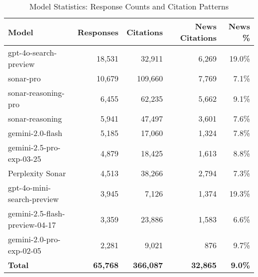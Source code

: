 \begin{table}[htbp]
\centering
\caption{Model Statistics: Response Counts and Citation Patterns}
\label{tab:model_stats}
\begin{tabular}{lrrrr}
\toprule
Model & Responses & Citations & News Citations & News \% \\
\midrule
gpt-4o-search-preview & 18,531 & 32,911 & 6,269 & 19.0\% \\
sonar-pro & 10,679 & 109,660 & 7,769 & 7.1\% \\
sonar-reasoning-pro & 6,455 & 62,235 & 5,662 & 9.1\% \\
sonar-reasoning & 5,941 & 47,497 & 3,601 & 7.6\% \\
gemini-2.0-flash & 5,185 & 17,060 & 1,324 & 7.8\% \\
gemini-2.5-pro-exp-03-25 & 4,879 & 18,425 & 1,613 & 8.8\% \\
Perplexity Sonar & 4,513 & 38,266 & 2,794 & 7.3\% \\
gpt-4o-mini-search-preview & 3,945 & 7,126 & 1,374 & 19.3\% \\
gemini-2.5-flash-preview-04-17 & 3,359 & 23,886 & 1,583 & 6.6\% \\
gemini-2.0-pro-exp-02-05 & 2,281 & 9,021 & 876 & 9.7\% \\
\midrule
\textbf{Total} & \textbf{65,768} & \textbf{366,087} & \textbf{32,865} & \textbf{9.0\%} \\
\bottomrule
\end{tabular}
\end{table}